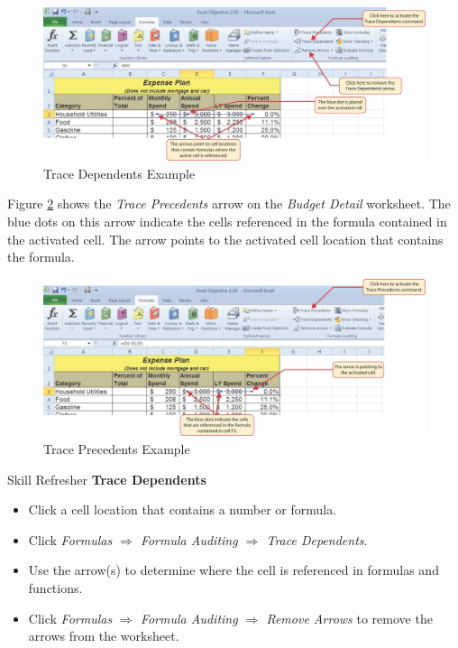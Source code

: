 \begin{figure}[H]
	\centering
	\includegraphics[width=\maxwidth{.95\linewidth}]{gfx/ch02_fig09}
	\caption{Trace Dependents Example}
	\label{02:fig09}
\end{figure}

Figure \ref{02:fig10} shows the \textit{Trace Precedents} arrow on the \textit{Budget Detail} worksheet. The blue dots on this arrow indicate the cells referenced in the formula contained in the activated cell. The arrow points to the activated cell location that contains the formula.

\begin{figure}[H]
	\centering
	\includegraphics[width=\maxwidth{.95\linewidth}]{gfx/ch02_fig10}
	\caption{Trace Precedents Example}
	\label{02:fig10}
\end{figure}

\begin{center}
	\begin{sklbox}{Skill Refresher}
		\textbf{Trace Dependents}
		\\
		\begin{itemize}
			\setlength{\itemsep}{0pt}
			\setlength{\parskip}{0pt}
			\setlength{\parsep}{0pt}
			
			\item Click a cell location that contains a number or formula.
			\item Click \textit{Formulas $ \Rightarrow $ Formula Auditing $ \Rightarrow $ Trace Dependents}.
			\item Use the arrow(s) to determine where the cell is referenced in formulas and functions.
			\item Click \textit{Formulas $ \Rightarrow $ Formula Auditing $ \Rightarrow $ Remove Arrows} to remove the arrows from the worksheet.
			
		\end{itemize}
	\end{sklbox}
\end{center}

